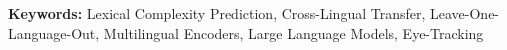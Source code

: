 

\maketitle

\begin{list}{}{\setlength{\rightmargin}{0.6cm}\setlength{\leftmargin}{0.6cm}}
\item[] \textbf{Keywords:} Lexical Complexity Prediction, Cross-Lingual Transfer,
Leave-One-Language-Out, Multilingual Encoders, Large Language Models, Eye-Tracking
\end{list}


